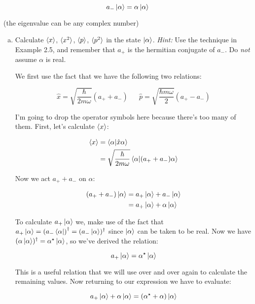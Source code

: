 \documentclass[10pt]{article}
\begin{document}
    \[ a_- \ket \alpha = \alpha \ket \alpha\]

    (the eigenvalue can be any complex number)

    \begin{enumerate}[(a)]
        \item Calculate $\langle x \rangle$, $\langle x^2 \rangle$, $\langle p \rangle$, $\langle p^2 \rangle$ in the state $\ket \alpha$. \textit{Hint:} Use the technique in Example 2.5, and remember that $a_+$ is the hermitian conjugate of $a_-$. Do \textit{not} assume $\alpha$ is real.
        
        \begin{solution}
            We first use the fact that we have the following two relations: 

            \[\hat x = \sqrt{\frac{\hbar}{2m \omega}} (a_+ + a_-) \phantom{aaa} \hat p = \sqrt{\frac{\hbar m \omega}{2}}(a_+ - a_-)\]

            I'm going to drop the operator symbols here because there's too many of them. First, let's calculate $\langle x \rangle$:

            \begin{align*}
                \langle x \rangle &= \braket{\alpha}{\hat x \alpha}\\
                &= \sqrt{\frac{\hbar}{2m\omega}} \braket{\alpha}{(a_+ + a_-)\alpha}
            \end{align*}

            Now we act $a_+ + a_-$ on $\alpha$: 

            \begin{align*}
                (a_+ + a_-) \ket{\alpha} &= a_+ \ket \alpha + a_- \ket \alpha\\
                &= a_+\ket \alpha + \alpha \ket \alpha
            \end{align*}

            To calculate $a_+\ket \alpha$ we, make use of the fact that $a_+ \ket \alpha = \left(a_- \bra{\alpha}\right)^\dagger = (a_- \ket \alpha)^\dagger$ since $\ket \alpha$ can be taken to be real. Now we have $(\alpha \ket \alpha)^\dagger = \alpha^\star \ket \alpha$, so we've derived the relation:

            \[ a_+ \ket \alpha = \alpha^\star \ket \alpha\] 

            This is a useful relation that we will use over and over again to calculate the remaining values. Now returning to our expression we have to evaluate: 

            \[  a_+\ket \alpha + \alpha \ket \alpha = (\alpha^\star + \alpha) \ket \alpha\] 


\end{solution}
\end{enumerate}
\end{document}

